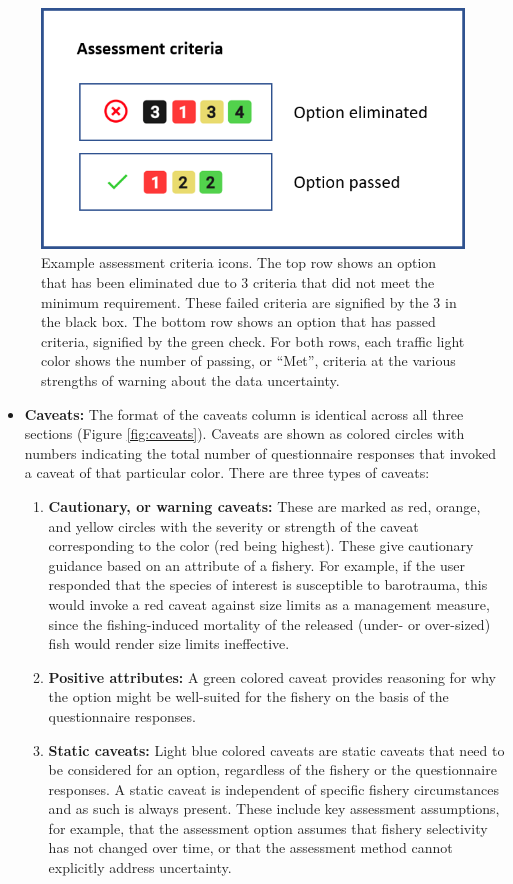 \documentclass[
  11pt,
]{book}
\providecommand{\tightlist}{%
  \setlength{\itemsep}{0pt}\setlength{\parskip}{0pt}}
\begin{document}
\begin{figure}

{\centering \includegraphics[width=0.35\linewidth]{images/a-criteria} 

}

\caption{Example assessment criteria icons. The top row shows an option that has been eliminated due to 3 criteria that did not meet the minimum requirement. These failed criteria are signified by the 3 in the black box. The bottom row shows an option that has passed criteria, signified by the green check. For both rows, each traffic light color shows the number of passing, or “Met”,  criteria at the various strengths of warning about the data uncertainty.}\label{fig:a-criteria}
\end{figure}

\begin{itemize}
\item
  \textbf{Caveats:} The format of the caveats column is identical across all three sections (Figure \ref{fig:caveats}). Caveats are shown as colored circles with numbers indicating the total number of questionnaire responses that invoked a caveat of that particular color. There are three types of caveats:

  \begin{enumerate}
  \def\labelenumi{\arabic{enumi}.}
  \tightlist
  \item
    \textbf{Cautionary, or warning caveats:} These are marked as red, orange, and yellow circles with the severity or strength of the caveat corresponding to the color (red being highest). These give cautionary guidance based on an attribute of a fishery. For example, if the user responded that the species of interest is susceptible to barotrauma, this would invoke a red caveat against size limits as a management measure, since the fishing-induced mortality of the released (under- or over-sized) fish would render size limits ineffective.
  \item
    \textbf{Positive attributes:} A green colored caveat provides reasoning for why the option might be well-suited for the fishery on the basis of the questionnaire responses.
  \item
    \textbf{Static caveats:} Light blue colored caveats are static caveats that need to be considered for an option, regardless of the fishery or the questionnaire responses. A static caveat is independent of specific fishery circumstances and as such is always present. These include key assessment assumptions, for example, that the assessment option assumes that fishery selectivity has not changed over time, or that the assessment method cannot explicitly address uncertainty.
  \end{enumerate}
\end{itemize}
\end{document}

